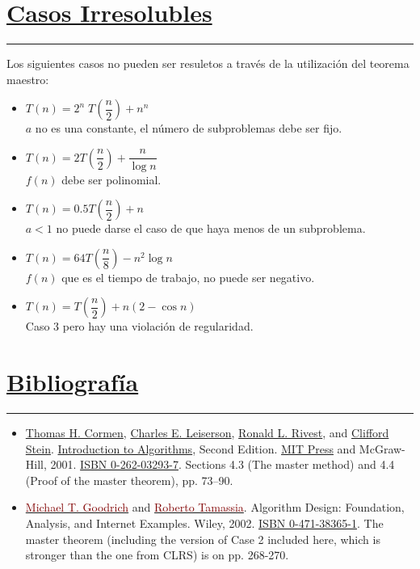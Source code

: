 \documentclass[a4paper,11pt]{article}
\begin{document}
\section[Casos Irresolubles]{\hyperlink{toc}{Casos Irresolubles}}
\noindent
{\color {Gray} \rule {\linewidth}{0.1mm}}
Los siguientes casos no pueden ser resuletos a través de la utilización del teorema maestro:\cite{Massachusetts}

\begin{itemize}
    \item $T(n)=2^{n}\;T(\dfrac{n}{2})+n^{n}$\\
    $a$ no es una constante, el número de subproblemas debe ser fijo.
    \item $T(n)=2T(\dfrac{n}{2})+\dfrac{n}{\log n}$\\
    $f(n)$ debe ser polinomial.
    \item $T(n)=0.5 T (\dfrac{n}{2})+n$\\
    $a < 1$ no puede darse el caso de que haya menos de un subproblema.
    \item $T(n)=64T(\dfrac{n}{8})-n^{2} \log n$\\
    $f(n)$ que es el tiempo de trabajo, no puede ser negativo.
    \item $T(n)=T(\dfrac{n}{2})+n(2-\cos n)$\\
    Caso 3 pero hay una violación de regularidad.
\end{itemize}

\newpage
\section[Bibliografía]{\hyperlink{toc}{Bibliografía}}
{\color {Gray} \rule {\linewidth}{0.1mm}}
\begin{itemize}[label={$\bullet$}]
	\item \href{https://es.wikipedia.org/wiki/Thomas_H._Cormen}{Thomas H. Cormen}, \href{https://es.wikipedia.org/wiki/Charles_E._Leiserson}{Charles E. Leiserson}, \href{https://es.wikipedia.org/wiki/Ronald_L._Rivest}{Ronald L. Rivest}, and \href{https://es.wikipedia.org/wiki/Clifford_Stein}{Clifford Stein}. \href{https://es.wikipedia.org/wiki/Introduction_to_Algorithms}{Introduction to Algorithms}, Second Edition. \href{https://es.wikipedia.org/wiki/MIT_Press}{MIT Press} and McGraw-Hill, 2001. \href{https://es.wikipedia.org/wiki/Especial:FuentesDeLibros/0262032937}{ISBN 0-262-03293-7}. Sections 4.3 (The master method) and 4.4 (Proof of the master theorem), pp. 73–90.
	
	\item \href{https://es.wikipedia.org/w/index.php?title=Michael_T._Goodrich&action=edit&redlink=1}{\textcolor{Maroon}{Michael T. Goodrich}} and \href{https://es.wikipedia.org/w/index.php?title=Roberto_Tamassia&action=edit&redlink=1}{\textcolor{Maroon}{Roberto Tamassia}}. Algorithm Design: Foundation, Analysis, and Internet Examples. Wiley, 2002. \href{https://es.wikipedia.org/wiki/Especial:FuentesDeLibros/0471383651}{ISBN 0-471-38365-1}. The master theorem (including the version of Case 2 included here, which is stronger than the one from CLRS) is on pp. 268-270.
\end{itemize}
\end{document}
